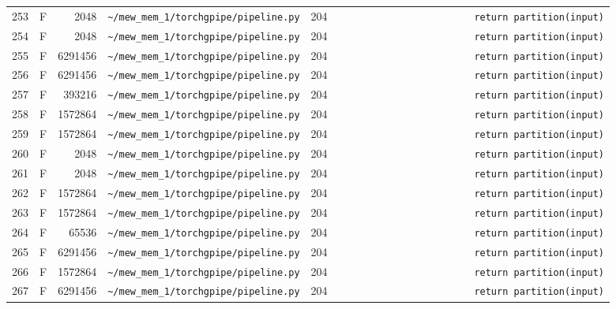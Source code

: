 \documentclass{article}
\begin{document}
\begin{longtable}{r l r p{6.5cm} r p{7.0cm}}
253 & F & 2048 & \lstinline|~/mew_mem_1/torchgpipe/pipeline.py| & 204 & \lstinline|                        return partition(input)| \\
254 & F & 2048 & \lstinline|~/mew_mem_1/torchgpipe/pipeline.py| & 204 & \lstinline|                        return partition(input)| \\
255 & F & 6291456 & \lstinline|~/mew_mem_1/torchgpipe/pipeline.py| & 204 & \lstinline|                        return partition(input)| \\
256 & F & 6291456 & \lstinline|~/mew_mem_1/torchgpipe/pipeline.py| & 204 & \lstinline|                        return partition(input)| \\
257 & F & 393216 & \lstinline|~/mew_mem_1/torchgpipe/pipeline.py| & 204 & \lstinline|                        return partition(input)| \\
258 & F & 1572864 & \lstinline|~/mew_mem_1/torchgpipe/pipeline.py| & 204 & \lstinline|                        return partition(input)| \\
259 & F & 1572864 & \lstinline|~/mew_mem_1/torchgpipe/pipeline.py| & 204 & \lstinline|                        return partition(input)| \\
260 & F & 2048 & \lstinline|~/mew_mem_1/torchgpipe/pipeline.py| & 204 & \lstinline|                        return partition(input)| \\
261 & F & 2048 & \lstinline|~/mew_mem_1/torchgpipe/pipeline.py| & 204 & \lstinline|                        return partition(input)| \\
262 & F & 1572864 & \lstinline|~/mew_mem_1/torchgpipe/pipeline.py| & 204 & \lstinline|                        return partition(input)| \\
263 & F & 1572864 & \lstinline|~/mew_mem_1/torchgpipe/pipeline.py| & 204 & \lstinline|                        return partition(input)| \\
264 & F & 65536 & \lstinline|~/mew_mem_1/torchgpipe/pipeline.py| & 204 & \lstinline|                        return partition(input)| \\
265 & F & 6291456 & \lstinline|~/mew_mem_1/torchgpipe/pipeline.py| & 204 & \lstinline|                        return partition(input)| \\
266 & F & 1572864 & \lstinline|~/mew_mem_1/torchgpipe/pipeline.py| & 204 & \lstinline|                        return partition(input)| \\
267 & F & 6291456 & \lstinline|~/mew_mem_1/torchgpipe/pipeline.py| & 204 & \lstinline|                        return partition(input)| \\

\end{longtable}
\end{document}
